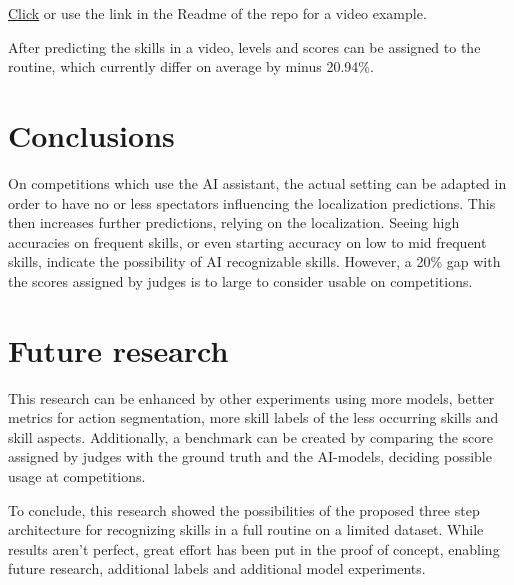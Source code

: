\documentclass[english,a0,portrait]{hogent-poster}
\begin{document}
\begin{multicols}{2}
\href{https://1drv.ms/v/c/6fa18b11a53f88a6/EWeE_YUHgkVJrhSFT4LIC3UB1WxjQLyZky4oNIUlqaqbQA?e=DBke8i}{Click} or use the link in the Readme of the repo for a video example.

After predicting the skills in a video, levels and scores can be assigned to the routine, which currently differ on average by minus 20.94\%.

\section{Conclusions}

On competitions which use the AI assistant, the actual setting can be adapted in order to have no or less spectators influencing the localization predictions. This then increases further predictions, relying on the localization. Seeing high accuracies on frequent skills, or even starting accuracy on low to mid frequent skills, indicate the possibility of AI recognizable skills. However, a 20\% gap with the scores assigned by judges is to large to consider usable on competitions.

\section{Future research}

This research can be enhanced by other experiments using more models, better metrics for action segmentation, more skill labels of the less occurring skills and skill aspects. Additionally, a benchmark can be created by comparing the score assigned by judges with the ground truth and the AI-models, deciding possible usage at competitions.

To conclude, this research showed the possibilities of the proposed three step architecture for recognizing skills in a full routine on a limited dataset. While results aren't perfect, great effort has been put in the proof of concept, enabling future research, additional labels and additional model experiments.
\end{multicols}
\end{document}
